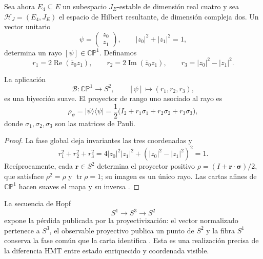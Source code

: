 Sea ahora \(E_4\subseteq E\) un subespacio \(J_E\)-estable de dimensión real
cuatro y sea \(\mathcal H_J=(E_4,J_E)\) el espacio de Hilbert resultante, de
dimensión compleja dos.
Un vector unitario
\[
 \psi=\begin{pmatrix}z_0\\z_1\end{pmatrix},
 \qquad |z_0|^2+|z_1|^2=1,
\]
determina un rayo \([\psi]\in\mathbb {CP}^{1}\). Definamos
\begin{equation}
 r_1=2\operatorname{Re}(\overline z_0z_1),
 \qquad
 r_2=2\operatorname{Im}(\overline z_0z_1),
 \qquad
 r_3=|z_0|^2-|z_1|^2.
 \label{eq:coordenadas-bloch-rev2}
\end{equation}

\begin{theorem}
\label{thm:bloch-proyectivo-rev2}
La aplicación
\[
 \mathcal B:\mathbb {CP}^{1}\longrightarrow S^2,
 \qquad [\psi]\longmapsto(r_1,r_2,r_3),
\]
es una biyección suave. El proyector de rango uno asociado al rayo es
\begin{equation}
 \rho_\psi=|\psi\rangle\langle\psi|
 =\frac12\bigl(I_2+r_1\sigma_1+r_2\sigma_2+r_3\sigma_3\bigr),
 \label{eq:proyector-bloch-rev2}
\end{equation}
donde \(\sigma_1,\sigma_2,\sigma_3\) son las matrices de Pauli.
\end{theorem}

\begin{proof}
La fase global deja invariantes las tres coordenadas y
\[
 r_1^2+r_2^2+r_3^2
 =4|z_0|^2|z_1|^2+(|z_0|^2-|z_1|^2)^2=1.
\]
Recíprocamente, cada \(\boldsymbol r\in S^2\) determina el proyector positivo
\(\rho=(I+\boldsymbol r\cdot\boldsymbol\sigma)/2\), que satisface
\(\rho^2=\rho\) y \(\operatorname{tr}\rho=1\); su imagen es un único rayo.
Las cartas afines de \(\mathbb {CP}^{1}\) hacen suaves el mapa y su inversa
\cite{Bloch1946}.
\end{proof}

La secuencia de Hopf
\begin{equation}
 S^1\longrightarrow S^3\longrightarrow S^2
 \label{eq:fibrado-hopf-bloch-rev2}
\end{equation}
expone la pérdida publicada por la proyectivización: el vector normalizado
pertenece a \(S^3\), el observable proyectivo publica un punto de \(S^2\) y
la fibra \(S^1\) conserva la fase común que la carta identifica
\cite{Hopf1931}. Esta es una realización precisa de la diferencia HMT entre
estado enriquecido y coordenada visible.

